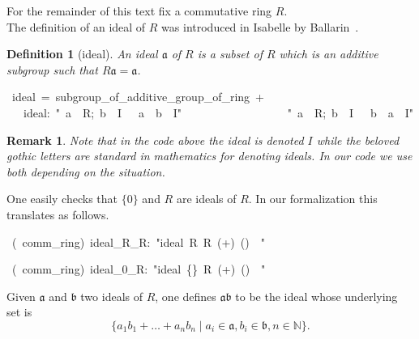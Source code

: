 \documentclass[12pt]{scrartcl}
\newtheorem{definition}[proposition]{Definition}
\newtheorem*{rem}{Remark}
\begin{document}
For the remainder of this text fix a commutative ring $R$. \\
The definition of an ideal of $R$ was introduced in Isabelle  by Ballarin~\cite{ballarin-exploring}.

\begin{definition}[ideal]
	An ideal $\mathfrak{a}$ of $R$ is a subset of $R$ which is an additive subgroup such that $R\mathfrak{a} = \mathfrak{a}$.
\end{definition}


\begin{isabelle}
\ ideal\ =\ subgroup\_of\_additive\_group\_of\_ring\ +\isanewline
\ \ \ ideal:\ "\isasymlbrakk \ a\ \isasymin \ R;\ b\ \isasymin \ I\ \isasymrbrakk \ \isasymLongrightarrow \ a\ \isasymcdot \ b\ \isasymin \ I"\ \isanewline
\ \ \ \ \ \ \ \ \ \ \ \ \ \ \ \ \ "\isasymlbrakk \ a\ \isasymin \ R;\ b\ \isasymin \ I\ \isasymrbrakk \ \isasymLongrightarrow \ b\ \isasymcdot \ a\ \isasymin \ I"
\end{isabelle}

\begin{rem}
	Note that in the code above the ideal is denoted $I$ while the beloved gothic letters are standard in mathematics for denoting ideals. In our code we use both depending on the situation.
\end{rem}	

One easily checks that $\lbrace 0 \rbrace$ and $R$ are ideals of $R$. In our formalization this translates as follows.


\begin{isabelle}
\ (\ comm\_ring)\ ideal\_R\_R:\ "ideal\ R\ R\ (+)\ (\isasymcdot )\ \isasymzero \ \isasymone "
\end{isabelle}

\begin{isabelle}
\ (\ comm\_ring)\ ideal\_0\_R:\ "ideal\ \{\isasymzero \}\ R\ (+)\ (\isasymcdot )\ \isasymzero \ \isasymone "
\end{isabelle}

Given $\mathfrak{a}$ and $\mathfrak{b}$ two ideals of $R$, one defines $\mathfrak{a} \mathfrak{b}$ to be the ideal whose underlying set is 
\[
	\lbrace a_1 b_1 + \dots + a_n b_n \mid a_i \in \mathfrak{a}, b_i \in \mathfrak{b}, n \in \mathbb{N} \rbrace.
\]
\end{document}
